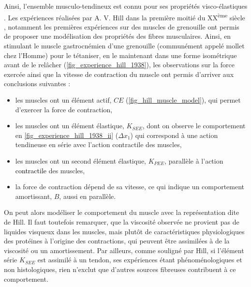 Ainsi, l'ensemble musculo-tendineux est connu pour ses propriétés visco-élastiques \parencite{bernstein_construction_1947, hill_series_1950}. Les expériences réalisées par A. V. Hill dans la première moitié du XX\textsuperscript{ème} siècle \parencite{hill_first_1970}, notamment les premières expériences sur des muscles de grenouille \parencite{hill_myothermic_1931, hill_heat_1938} ont permis de proposer une modélisation des propriétés des fibres musculaires. Ainsi, en stimulant le muscle gastrocnémien d'une grenouille (communément appelé mollet chez l'Homme) pour le tétaniser, en le maintenant dans une forme isométrique avant de le relâcher (\cref{fig_experience_hill_1938}), les observations sur la force exercée ainsi que la vitesse de contraction du muscle ont permis d'arriver aux conclusions suivantes :
%
\begin{itemize}
	\item les muscles ont un élément actif, $CE$ (\cref{fig_hill_muscle_model}), qui permet d'exercer la force de contraction,
	\item les muscles ont un élément élastique, $K_{SEE}$, dont on observe le comportement en \cref{fig_experience_hill_1938_ii} ($\Delta x_1$) qui correspond à une action tendineuse en série avec l'action contractile des muscles,
	\item les muscles ont un second élément élastique, $K_{PEE}$, parallèle à l'action \textcolor{black}{contractile} des muscles,
	\item la force de contraction dépend de sa vitesse, ce qui indique un comportement amortissant, $B$, aussi en parallèle.
\end{itemize}

\tikzexternalenable 


On peut alors modéliser le comportement du muscle avec la représentation dite de Hill. Il faut toutefois remarquer, que la viscosité observée ne provient pas de liquides visqueux dans les muscles, mais plutôt de caractéristiques physiologiques des protéines à l'origine des contractions, qui peuvent être assimilées à de la viscosité ou un amortissement. Par ailleurs, comme souligné par Hill, si l'élément série $K_{SEE}$ est assimilé à un tendon, ses expériences étant phénoménologiques et non histologiques, rien n'exclut que d'autres sources fibreuses contribuent à ce comportement.



